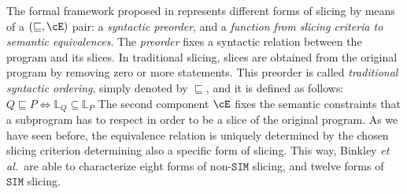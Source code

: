 \documentclass[prodmode,acmtocl]{acmsmall}
\def\prog{\ensuremath{P}\xspace}
\def\progq{\ensuremath{Q}\xspace}
\def\lnums{\ensuremath{\mathbb{L}}\xspace}
\def\SIM{\ensuremath{\mathtt{SIM}}\xspace}
\def\etal{{\it et al.\ }}
\newcommand{\0}{\mbox{\bf 0}}
\begin{document}
The formal framework proposed in \cite{AForm,TheoFoun} represents
different forms of slicing by means of a $(\sqsubseteq,\cE)$ pair: a
\emph{syntactic preorder}, and a \emph{function from slicing criteria
  to semantic equivalences}.  The \emph{preorder} fixes a syntactic
relation between the program and its slices.  In traditional slicing,
 slices are obtained from the
original program by removing zero or more statements.  This preorder
is called \emph{traditional syntactic ordering}, simply denoted by
$\sqsubseteq$, and it is defined as follows: $\progq \sqsubseteq \prog
\Leftrightarrow \lnums_\progq \subseteq \lnums_\prog$
The second component $\cE$ fixes the semantic constraints that a
subprogram has to respect in order to be a slice of the original
program.  As we have seen before, the equivalence relation is uniquely
determined by the chosen slicing criterion determining also a specific form of slicing.
This way, Binkley \etal are able to characterize eight forms of
non-$\SIM$ slicing, and twelve forms of $\SIM$ slicing.
\end{document}
